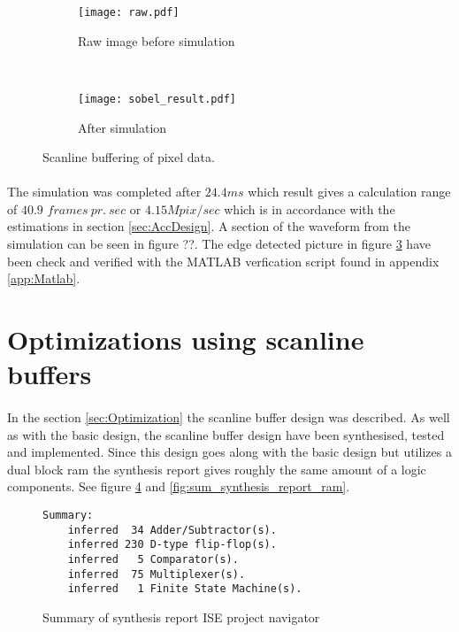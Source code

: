 \begin{figure}[H]
	\centering
	\begin{subfigure}[b]{0.4\textwidth}
		\texttt{[image: raw.pdf]}
		\caption{Raw image before simulation}
		\label{fig:test_picture_raw}
    \end{subfigure}%
        ~ %
    \begin{subfigure}[b]{0.4\textwidth}
    	\texttt{[image: sobel\_result.pdf]}
    	\caption{After simulation}
    	\label{fig:test_picture_sobel}
	\end{subfigure}
	\caption{Scanline buffering of pixel data.}
\end{figure}

\paragraph*{}
The simulation was completed after $24.4ms$ which result gives a calculation range of $40.9$ $frames~pr.~sec$ or $4.15Mpix/sec$ which is in accordance with the estimations in section \ref{sec:AccDesign}. A section of the waveform from the simulation can be seen in figure ??. The edge detected picture in figure \ref{fig:test_picture_sobel} have been check and verified with the MATLAB verfication script found in appendix \ref{app:Matlab}.   

\section{Optimizations using scanline buffers}
\paragraph*{}
In the section \ref{sec:Optimization} the scanline buffer design was described. As well as with the basic design, the scanline buffer design have been synthesised, tested and implemented. Since this design goes along with the basic design but utilizes a dual block ram the synthesis report gives roughly the same amount of a logic components. See figure \ref{fig:sum_synthesis_report} and \ref{fig:sum_synthesis_report_ram}.   
    
\begin{figure}[H]
\centering
\begin{BVerbatim}
Summary:
    inferred  34 Adder/Subtractor(s).
    inferred 230 D-type flip-flop(s).
    inferred   5 Comparator(s).
    inferred  75 Multiplexer(s).
    inferred   1 Finite State Machine(s).
\end{BVerbatim}
\caption{Summary of synthesis report ISE project navigator}
\label{fig:sum_synthesis_report}
\end{figure}

